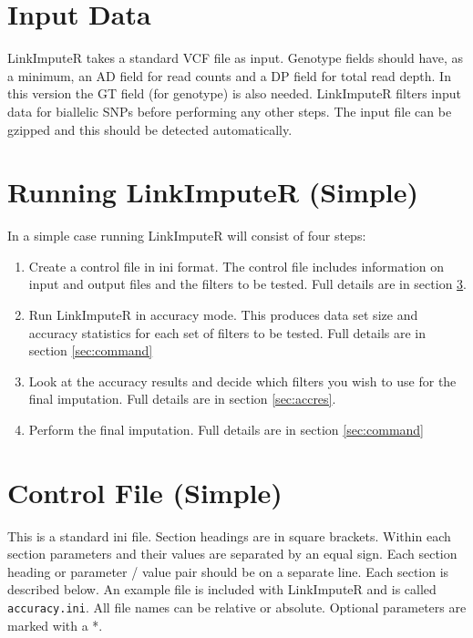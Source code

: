 \documentclass[10pt]{report}
\begin{document}
\section{Input Data}

LinkImputeR takes a standard VCF file as input.  Genotype fields should have, as a minimum, an AD field for read counts and a DP field for total read depth.  In this version the GT field (for genotype) is also needed.  LinkImputeR filters input data for biallelic SNPs before performing any other steps.  The input file can be gzipped and this should be detected automatically.

\section{Running LinkImputeR (Simple)}
In a simple case running LinkImputeR will consist of four steps:
\begin{enumerate}
\item Create a control file in ini format.  The control file includes information on input and output files and the filters to be tested.  Full details are in section \ref{sec:ini}.
\item Run LinkImputeR in accuracy mode.  This produces data set size and accuracy statistics for each set of filters to be tested.  Full details are in section \ref{sec:command}
\item Look at the accuracy results and decide which filters you wish to use for the final imputation.  Full details are in section \ref{sec:accres}.
\item Perform the final imputation.  Full details are in section \ref{sec:command}
\end{enumerate}

\section{Control File (Simple)}
\label{sec:ini}
This is a standard ini file.  Section headings are in square brackets.  Within each section parameters and their values are separated by an equal sign.  Each section heading or parameter / value pair should be on a separate line.  Each section is described below.  An example file is included with LinkImputeR and is called \texttt{accuracy.ini}.  All file names can be relative or absolute.  Optional parameters are marked with a *.
\end{document}

